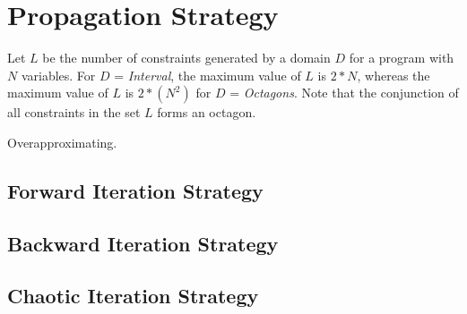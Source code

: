 \section{Propagation Strategy}\label{deduction}
Let $L$ be the number of constraints generated by a domain $D$
for a program with $N$ variables. For $D$ = {\em Interval}, the 
maximum value of $L$ is $2*N$, whereas the maximum value of $L$ is 
$2*(N^2)$ for $D$ = {\em Octagons}. Note that the conjunction of all 
constraints in the set $L$ forms an octagon.

Overapproximating.
\subsection{Forward Iteration Strategy}

\subsection{Backward Iteration Strategy}

\subsection{Chaotic Iteration Strategy}  

